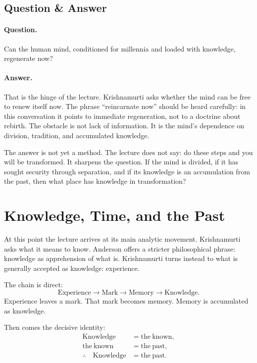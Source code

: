 \subsection{Question \& Answer}

\paragraph{Question.}
Can the human mind, conditioned for millennia and loaded with knowledge, regenerate now?

\paragraph{Answer.}
That is the hinge of the lecture. Krishnamurti asks whether the mind can be free to renew itself now. The phrase ``reincarnate now'' should be heard carefully: in this conversation it points to immediate regeneration, not to a doctrine about rebirth. The obstacle is not lack of information. It is the mind's dependence on division, tradition, and accumulated knowledge.

The answer is not yet a method. The lecture does not say: do these steps and you will be transformed. It sharpens the question. If the mind is divided, if it has sought security through separation, and if its knowledge is an accumulation from the past, then what place has knowledge in transformation?

\section{Knowledge, Time, and the Past}

At this point the lecture arrives at its main analytic movement. Krishnamurti asks what it means to know. Anderson offers a stricter philosophical phrase: knowledge as apprehension of what is. Krishnamurti turns instead to what is generally accepted as knowledge: experience.

The chain is direct:
\begin{equation}
\mathrm{Experience}
\longrightarrow
\mathrm{Mark}
\longrightarrow
\mathrm{Memory}
\longrightarrow
\mathrm{Knowledge}.
\end{equation}
Experience leaves a mark. That mark becomes memory. Memory is accumulated as knowledge.

Then comes the decisive identity:
\begin{align}
\mathrm{Knowledge} &= \mathrm{the\ known},\\
\mathrm{the\ known} &= \mathrm{the\ past},\\
\therefore\quad \mathrm{Knowledge} &= \mathrm{the\ past}.
\end{align}

